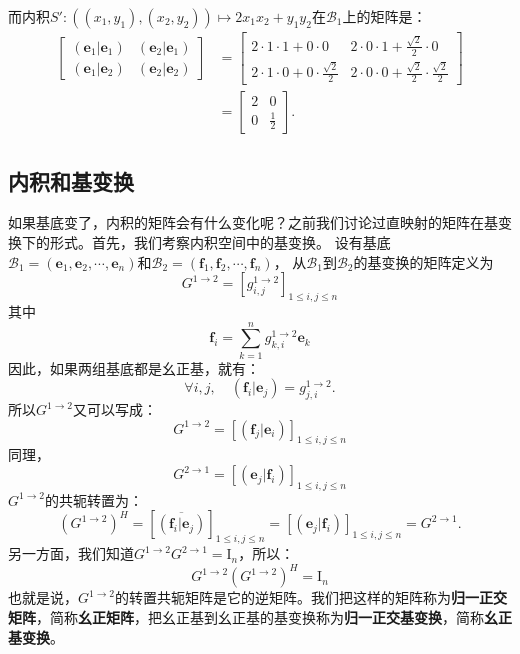 \documentclass[12pt,UTF8]{ctexbook}
\begin{document}
而内积$S': \left((x_1, y_1), (x_2, y_2) \right) \mapsto 2 x_1 x_2 + y_1 y_2$在$\mathcal{B}_1$上的矩阵是：
\begin{align*}
    \begin{bmatrix}
        (\mathbf{e}_1 |\mathbf{e}_1) & (\mathbf{e}_2 |\mathbf{e}_1) \\
        (\mathbf{e}_1 |\mathbf{e}_2) & (\mathbf{e}_2 |\mathbf{e}_2)
    \end{bmatrix} &= \begin{bmatrix}
        2\cdot 1\cdot 1 + 0\cdot 0 &  2\cdot 0\cdot 1 + \frac{\sqrt{2}}{2} \cdot 0 \\
        2\cdot 1\cdot 0 + 0\cdot \frac{\sqrt{2}}{2} & 2\cdot 0\cdot 0 + \frac{\sqrt{2}}{2} \cdot \frac{\sqrt{2}}{2}
    \end{bmatrix}  \\
    &= \begin{bmatrix}
       2 & 0 \\
       0 & \frac12
    \end{bmatrix}. 
\end{align*}

\subsection{内积和基变换}
如果基底变了，内积的矩阵会有什么变化呢？之前我们讨论过直映射的矩阵在基变换下的形式。首先，我们考察内积空间中的基变换。
设有基底$ \mathcal{B}_1 = (\mathbf{e}_1, \mathbf{e}_2, \cdots , \mathbf{e}_n )$和$ \mathcal{B}_2 = (\mathbf{f}_1, \mathbf{f}_2, \cdots , \mathbf{f}_n )$，
从$\mathcal{B}_1$到$\mathcal{B}_2$的基变换的矩阵定义为
$$ G^{1\rightarrow 2} = \left[g_{i,j}^{1\rightarrow 2}\right]_{1\leqslant i , j \leqslant n} $$
其中
$$ \mathbf{f}_i = \sum_{k=1}^n g_{k,i}^{1\rightarrow 2} \mathbf{e}_k $$
因此，如果两组基底都是幺正基，就有：
$$ \forall i, j, \quad (\mathbf{f}_i | \mathbf{e}_j) = g_{j,i}^{1\rightarrow 2}. $$
所以$ G^{1\rightarrow 2}$又可以写成：
$$ G^{1\rightarrow 2} = [(\mathbf{f}_j | \mathbf{e}_i)]_{1\leqslant i , j \leqslant n} $$
同理，
$$ G^{2\rightarrow 1} = [(\mathbf{e}_j | \mathbf{f}_i)]_{1\leqslant i , j \leqslant n} $$
$ G^{1\rightarrow 2}$的共轭转置为：
$$ \left(G^{1\rightarrow 2} \right)^H = [\overline{(\mathbf{f}_i | \mathbf{e}_j)}]_{1\leqslant i , j \leqslant n} = [(\mathbf{e}_j | \mathbf{f}_i)]_{1\leqslant i , j \leqslant n} = G^{2\rightarrow 1}. $$
另一方面，我们知道$ G^{1\rightarrow 2} G^{2\rightarrow 1} = \mathrm{I}_n $，所以：
$$ G^{1\rightarrow 2} \left(G^{1\rightarrow 2} \right)^H = \mathrm{I}_n $$
也就是说，$G^{1\rightarrow 2}$的转置共轭矩阵是它的逆矩阵。我们把这样的矩阵称为\textbf{归一正交矩阵}，简称\textbf{幺正矩阵}，把幺正基到幺正基的基变换称为\textbf{归一正交基变换}，简称\textbf{幺正基变换}。
\end{document}
